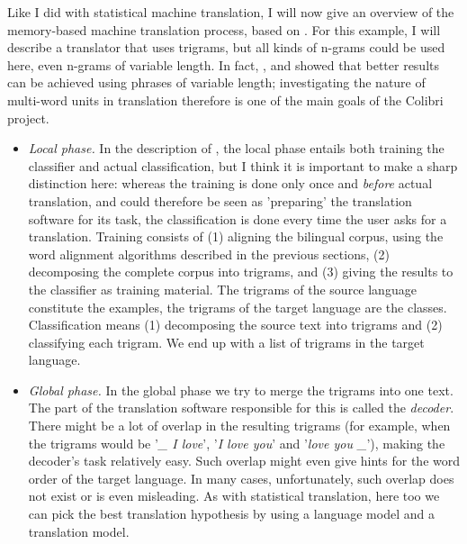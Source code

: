 \documentclass[12pt]{article}
\begin{document}
Like I did with statistical machine translation, I will now give an overview of the memory-based machine translation process, based on \citet{vdbb09}. For this example, I will describe a translator that uses trigrams, but all kinds of n-grams could be used here, even n-grams of variable length. In fact, \citet{vangompel09}, \citet{vangompelea09} and \citet{vangompel11} showed that better results can be achieved using phrases of variable length; investigating the nature of multi-word units in translation therefore is one of the main goals of the Colibri project.

\begin{itemize}
\item \emph{Local phase.} In the description of \citet{vdbb09}, the local phase entails both training the classifier and actual classification, but I think it is important to make a sharp distinction here: whereas the training is done only once and \emph{before} actual translation, and could therefore be seen as 'preparing' the translation software for its task, the classification is done every time the user asks for a translation. Training consists of (1) aligning the bilingual corpus, using the word alignment algorithms described in the previous sections, (2) decomposing the complete corpus into trigrams, and (3) giving the results to the classifier as training material. The trigrams of the source language constitute the examples, the trigrams of the target language are the classes. Classification means (1) decomposing the source text into trigrams and (2) classifying each trigram. We end up with a list of trigrams in the target language.


\item \emph{Global phase.} In the global phase we try to merge the trigrams into one text. The part of the translation software responsible for this is called the \emph{decoder}. There might be a lot of overlap in the resulting trigrams (for example, when the trigrams would be '\emph{\_ I love}', '\emph{I love you}' and '\emph{love you \_}'), making the decoder's task relatively easy. Such overlap might even give hints for the word order of the target language. In many cases, unfortunately, such overlap does not exist or is even misleading. As with statistical translation, here too we can pick the best translation hypothesis by using a language model and a translation model. 


\end{itemize}
\end{document}
